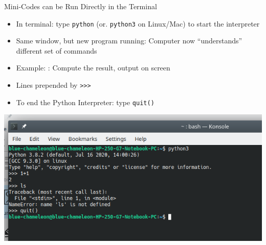 \begin{frame}{Mini-Codes can be Run Directly in the Terminal}
%
\begin{minipage}[t]{.39\linewidth}
\begin{itemize}
\item In terminal: type \texttt{python} (or. \texttt{python3} on Linux/Mac) to start the interpreter
\item Same window, but new program running: Computer now \enquote{understands} different set of commands
\item Example: : Compute the result, output on screen
\item Lines prepended by \texttt{>{}>{}>}
\item To end the Python Interpreter: type \texttt{quit()}
\end{itemize}
\end{minipage}
%
%
\begin{minipage}[t]{.59\linewidth}
\vspace{0pt}
\includegraphics[width=\linewidth]{./gfx/interpreterConsole}
\end{minipage}
%
\end{frame}


